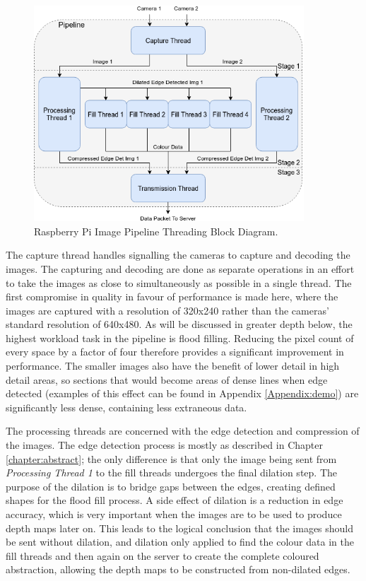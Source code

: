 \begin{figure}[H]
    \begin{center}
      \includegraphics[width=0.9\textwidth]{Figures/Threads.png}
      \caption[Raspberry Pi Image Pipeline Threading Block Diagram]{Raspberry Pi Image Pipeline Threading Block Diagram.}
      \label{fig:threads}
    \end{center}
\end{figure}

The capture thread handles signalling the cameras to capture and decoding the images. The capturing and decoding are done as separate operations in an effort to take the images as close to simultaneously as possible in a single thread. The first compromise in quality in favour of performance is made here, where the images are captured with a resolution of 320x240 rather than the cameras' standard resolution of 640x480. As will be discussed in greater depth below, the highest workload task in the pipeline is flood filling. Reducing the pixel count of every space by a factor of four therefore provides a significant improvement in performance. The smaller images also have the benefit of lower detail in high detail areas, so sections that would become areas of dense lines when edge detected (examples of this effect can be found in Appendix \ref{Appendix:demo}) are significantly less dense, containing less extraneous data.

The processing threads are concerned with the edge detection and compression of the images. The edge detection process is mostly as described in Chapter \ref{chapter:abstract}; the only difference is that only the image being sent from \emph{Processing Thread 1} to the fill threads undergoes the final dilation step. The purpose of the dilation is to bridge gaps between the edges, creating defined shapes for the flood fill process. A side effect of dilation is a reduction in edge accuracy, which is very important when the images are to be used to produce depth maps later on. This leads to the logical conclusion that the images should be sent without dilation, and dilation only applied to find the colour data in the fill threads and then again on the server to create the complete coloured abstraction, allowing the depth maps to be constructed from non-dilated edges. 

